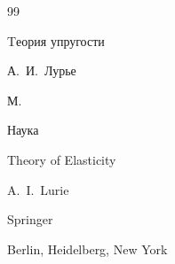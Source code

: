 \begin{thebibliography}{99}

\book Tеория упругости

\by А.~И.~Лурье

\publaddr М.

\publ Наука



\transl

\book Theory of Elasticity

\by A.~I.~Lurie

\publ Springer

\publaddr Berlin, Heidelberg, New York














\end{thebibliography}





\renewcommand{\correctvfill}{\vspace{-9mm}}



%


%



%

\makeentitle







\newpage

%


%

%

